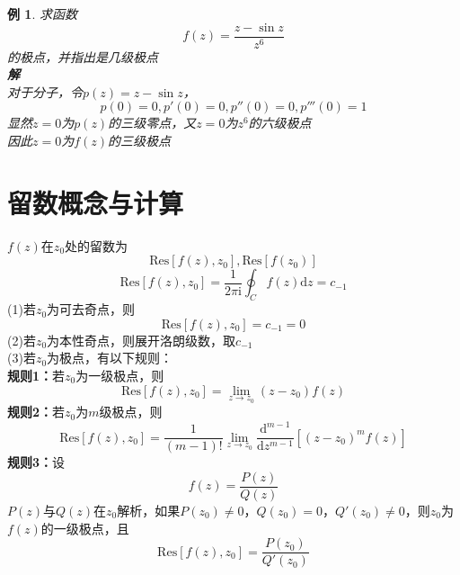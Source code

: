 \documentclass[12pt, a4paper, twoside]{ctexbook}
\newtheorem{example}[theorem]{例}
\begin{document}
\begin{example}
	求函数
	$$
	f\left(z\right)=\frac{z-\sin z}{z^6}
	$$
	\hspace*{2em}的极点，并指出是几级极点\\
	\hspace*{1em}\textbf{解}\\
	\hspace*{2em}对于分子，令$p\left(z\right)=z-\sin z$，
	$$
	p\left(0\right)=0,p'\left(0\right)=0,p''\left(0\right)=0,p'''\left(0\right)=1
	$$
	\hspace*{2em}显然$z=0$为$p\left(z\right)$的三级零点，又$z=0$为$z^6$的六级极点\\
	\hspace*{2em}因此$z=0$为$f\left(z\right)$的三级极点\\
\end{example}

\section{留数概念与计算}
$f\left(z\right)$在$z_0$处的留数为
$$
\mathrm{Res}\left[f\left(z\right),z_0\right],\mathrm{Res}\left[f\left(z_0\right)\right]
$$
$$
\mathrm{Res}\left[f\left(z\right),z_0\right]=\frac{1}{2\pi\mathrm{i}}\oint_C{f\left(z\right)\mathrm{d}z}=c_{-1}
$$
(1)若$z_0$为可去奇点，则
$$
\mathrm{Res}\left[f\left(z\right),z_0\right]=c_{-1}=0
$$
(2)若$z_0$为本性奇点，则展开洛朗级数，取$c_{-1}$\\
(3)若$z_0$为极点，有以下规则：\\
\hspace*{2em}\textbf{规则1：}若$z_0$为一级极点，则
$$
\mathrm{Res}\left[f\left(z\right),z_0\right]=\lim_{z\to z_0}{\left(z-z_0\right)f\left(z\right)}
$$
\hspace*{2em}\textbf{规则2：}若$z_0$为$m$级极点，则
$$
\mathrm{Res}\left[f\left(z\right),z_0\right]=\frac{1}{\left(m-1\right)!}\lim_{z\to z_0}\frac{\mathrm{d}^{m-1}}{\mathrm{d}z^{m-1}}\left[\left(z-z_0\right)^m f\left(z\right)\right]
$$
\hspace*{2em}\textbf{规则3：}设
$$
f\left(z\right)=\frac{P\left(z\right)}{Q\left(z\right)}
$$
$P\left(z\right)$与$Q\left(z\right)$在$z_0$解析，如果$P\left(z_0\right)\neq 0$，$Q\left(z_0\right)=0$，$Q'\left(z_0\right)\neq 0$，则$z_0$为$f\left(z\right)$的一级极点，且
$$
\mathrm{Res}\left[f\left(z\right),z_0\right]=\frac{P\left(z_0\right)}{Q'\left(z_0\right)}
$$
\end{document}
